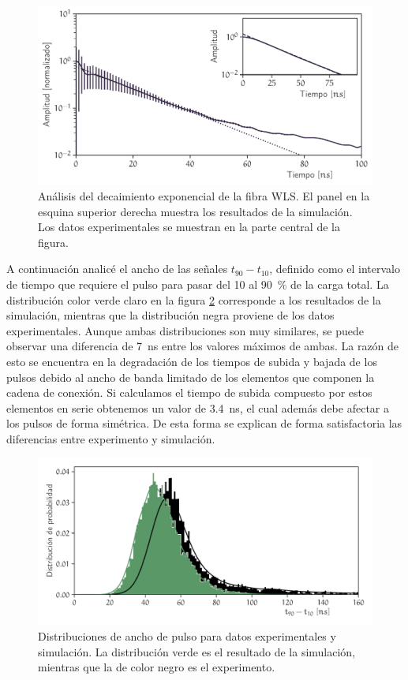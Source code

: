 \begin{figure}
        \centering
        \includegraphics[width=\textwidth]{muons-tail-fit.pdf}
        \caption{Análisis del decaimiento exponencial de la fibra WLS. El panel en la esquina superior derecha muestra los resultados de la simulación. Los datos experimentales se muestran en la parte central de la figura.}
        \label{fig:muons-tail}
\end{figure}

A continuación analicé el ancho de las señales $t_{90}-t_{10}$, definido como el intervalo de tiempo que requiere el pulso para pasar del \num{10} al \SI{90}{\percent} de la carga total. La distribución color verde claro en la figura \ref{fig:t90-distribution} corresponde a los resultados de la simulación, mientras que la distribución negra proviene de los datos experimentales. Aunque ambas distribuciones son muy similares, se puede observar una diferencia de \SI{7}{\ns} entre los valores máximos de ambas. La razón de esto se encuentra en la degradación de los tiempos de subida y bajada de los pulsos debido al ancho de banda limitado de los elementos que componen la cadena de conexión. Si calculamos el tiempo de subida compuesto por estos elementos en serie obtenemos un valor de \SI{3.4}{\ns}, el cual además debe afectar a los pulsos de forma simétrica. De esta forma se explican de forma satisfactoria las diferencias entre experimento y simulación.

\begin{figure}
        \centering
        \includegraphics[width=\textwidth]{t90_dist.pdf}
        \caption{Distribuciones de ancho de pulso para datos experimentales y simulación. La distribución verde es el resultado de la simulación, mientras que la de color negro es el experimento.}
        \label{fig:t90-distribution}
\end{figure}

